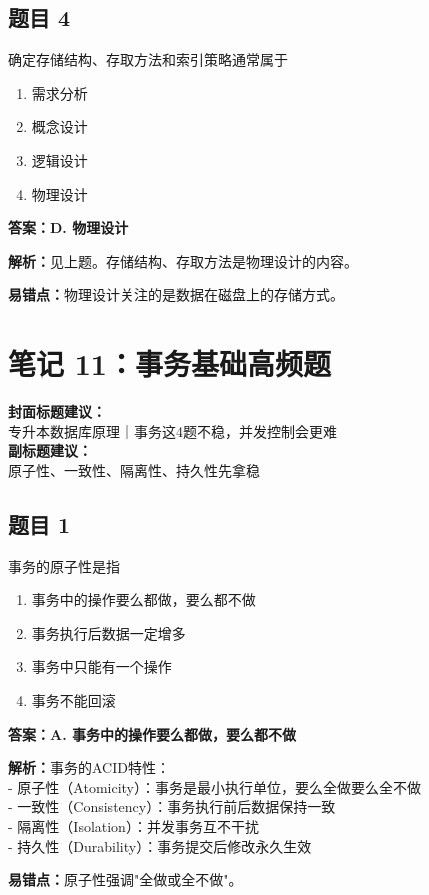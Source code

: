 \documentclass[12pt,a4paper]{ctexart}
\begin{document}
\subsection*{题目 4}
确定存储结构、存取方法和索引策略通常属于
\begin{enumerate}[label=\Alph*.]
	\item 需求分析
	\item 概念设计
	\item 逻辑设计
	\item 物理设计
\end{enumerate}

\begin{answerbox}
	\textbf{答案：D. 物理设计}

	\textbf{解析：}见上题。存储结构、存取方法是物理设计的内容。

	\textbf{易错点：}物理设计关注的是数据在磁盘上的存储方式。
\end{answerbox}

\newpage

\section{笔记 11：事务基础高频题}
\begin{coverbox}
	\textbf{封面标题建议：}\\
	专升本数据库原理｜事务这4题不稳，并发控制会更难\\
	\textbf{副标题建议：}\\
	原子性、一致性、隔离性、持久性先拿稳
\end{coverbox}

\subsection*{题目 1}
事务的原子性是指
\begin{enumerate}[label=\Alph*.]
	\item 事务中的操作要么都做，要么都不做
	\item 事务执行后数据一定增多
	\item 事务中只能有一个操作
	\item 事务不能回滚
\end{enumerate}

\begin{answerbox}
	\textbf{答案：A. 事务中的操作要么都做，要么都不做}

	\textbf{解析：}事务的ACID特性：\\
	- 原子性（Atomicity）：事务是最小执行单位，要么全做要么全不做\\
	- 一致性（Consistency）：事务执行前后数据保持一致\\
	- 隔离性（Isolation）：并发事务互不干扰\\
	- 持久性（Durability）：事务提交后修改永久生效

	\textbf{易错点：}原子性强调"全做或全不做"。
\end{answerbox}
\end{document}
